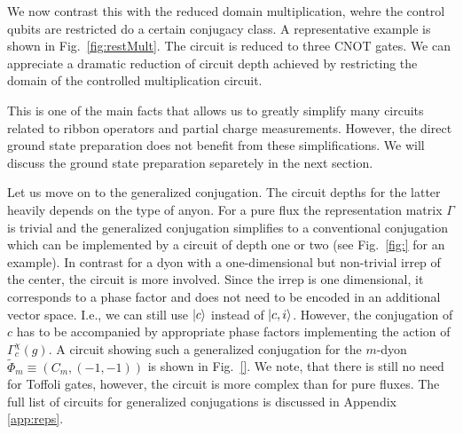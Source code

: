 \documentclass[two column]{article}
\begin{document}
We now contrast this with the reduced domain multiplication, wehre the control qubits are restricted do a certain conjugacy class. A representative example is shown in Fig.~\ref{fig:restMult}. The circuit is reduced to three CNOT gates. We can appreciate a dramatic reduction of circuit depth achieved by restricting the domain of the controlled multiplication circuit.

This is one of the main facts that allows us to greatly simplify many circuits related to ribbon operators and partial charge measurements. However, the direct ground state preparation does not benefit from these simplifications. We will discuss the ground state preparation separetely in the next section.


Let us move on to the generalized conjugation. The circuit depths for the latter heavily depends on the type of anyon. For a pure flux the representation matrix $\Gamma$ is trivial and the generalized conjugation simplifies to a conventional conjugation which can be implemented by a circuit of depth one or two (see Fig.~\ref{fig:} for an example). In contrast for a dyon with a one-dimensional but non-trivial irrep of the center, the circuit is more involved. Since the irrep is one dimensional, it corresponds to a phase factor and does not need to be encoded in an additional vector space. I.e., we can still use $\ket{c}$ instead of $\ket{c,i}$. However, the conjugation of $c$ has to be accompanied by appropriate phase factors implementing the action of $\Gamma^\chi_c(g)$. A circuit showing such a generalized conjugation for the $m$-dyon $\tilde{\Phi}_m \equiv (C_m, (-1, -1))$ is shown in Fig.~\ref{}. We note, that there is still no need for Toffoli gates, however, the circuit is more complex than for pure fluxes. The full list of circuits for generalized conjugations is discussed in Appendix \ref{app:reps}.
\end{document}
